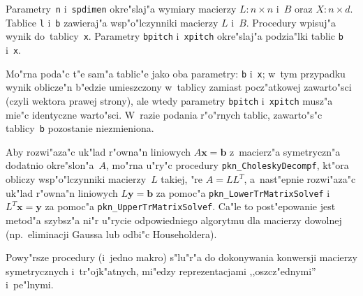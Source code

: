 Parametry~\texttt{n} i~\texttt{spdimen} okre"slaj"a wymiary macierzy
$L\colon n\times n$ i~$B$ oraz $X\colon n\times d$. Tablice \texttt{l}
i~\texttt{b} zawieraj"a wsp"o"lczynniki macierzy $L$ i~$B$. Procedury
wpisuj"a wynik do~tablicy~\texttt{x}. Parametry \texttt{bpitch}
i~\texttt{xpitch} okre"slaj"a podzia"lki tablic \texttt{b} i~\texttt{x}.

Mo"rna poda"c t"e sam"a tablic"e jako oba parametry: \texttt{b} i~\texttt{x};
w~tym przypadku wynik oblicze"n b"edzie umieszczony w~tablicy zamiast
pocz"atkowej zawarto"sci (czyli wektora prawej strony), ale wtedy
parametry \texttt{bpitch} i~\texttt{xpitch} musz"a mie"c identyczne
warto"sci. W~razie podania r"o"rnych tablic, zawarto"s"c tablicy~\texttt{b}
pozostanie niezmieniona.

\vspace{\medskipamount}
Aby rozwi"aza"c uk"lad r"owna"n liniowych $A\bm{x}=\bm{b}$ z~macierz"a
symetryczn"a dodatnio okre"slon"a~$A$, mo"rna u"ry"c procedury
\texttt{pkn\_CholeskyDecompf}, kt"ora obliczy wsp"o"lczynniki macierzy~$L$
takiej, "re $A=LL^T$, a~nast"epnie rozwi"aza"c uk"lad r"owna"n liniowych
$L\bm{y}=\bm{b}$ za pomoc"a \texttt{pkn\_LowerTrMatrixSolvef}
i~$L^T\bm{x}=\bm{y}$ za pomoc"a \texttt{pkn\_UpperTrMatrixSolvef}.
Ca"le to post"epowanie jest metod"a szybsz"a ni"r u"rycie odpowiedniego
algorytmu dla macierzy dowolnej (np.\ eliminacji Gaussa lub odbi"c
Householdera).

\vspace{\bigskipamount}
Powy"rsze procedury (i~jedno makro) s"lu"r"a do dokonywania konwersji
macierzy symetrycznych i~tr"ojk"atnych, mi"edzy reprezentacjami
,,oszcz"ednymi'' i~pe"lnymi.

